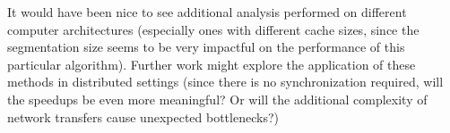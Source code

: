 It would have been nice to see additional analysis performed on different computer architectures (especially ones with different cache sizes, since the segmentation size seems to be very impactful on the performance of this particular algorithm). Further work might explore the application of these methods in distributed settings (since there is no synchronization required, will the speedups be even more meaningful? Or will the additional complexity of network transfers cause unexpected bottlenecks?)